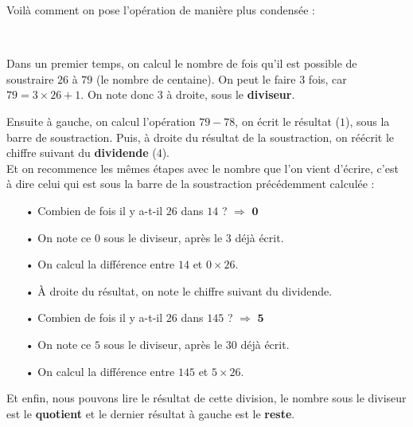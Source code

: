 \documentclass[a4paper]{article}
\begin{document}
\singlespacing

Voilà comment on pose l'opération de manière plus condensée : 

	\begin{center}

	 \\

	\end{center}

Dans un premier temps, on calcul le nombre de fois qu'il est possible de soustraire $26$ à $79$ (le nombre de centaine). On peut le faire $3$ fois, car $79 = 3 \times 26+1$. On note donc $3$ à droite, sous le \textbf{diviseur}. 

Ensuite à gauche, on calcul l'opération $79-78$, on écrit le résultat ($1$), sous la barre de soustraction. Puis, à droite du résultat de la soustraction, on réécrit le chiffre suivant du \textbf{dividende} ($4$).\\

Et on recommence les mêmes étapes avec le nombre que l'on vient d'écrire, c'est à dire celui qui est sous la barre de la soustraction précédemment calculée : 

\vspace{2 mm}

	\begin{itemize}
	
	\item[•] Combien de fois il y a-t-il $26$ dans $14$ ? $\Longrightarrow$ $\mathbf{0}$
	\item[•] On note ce $\mathit{0}$ sous le diviseur, après le $\mathit{3}$ déjà écrit.
	\item[•] On calcul la différence entre $14$ et $0\times26$.
	\item[•] À droite du résultat, on note le chiffre suivant du dividende.
	\vspace{2 mm}
	\item[•] Combien de fois il y a-t-il $26$ dans $145$ ? $\Longrightarrow$ $\mathbf{5}$
	\item[•] On note ce $\mathit{5}$ sous le diviseur, après le $\mathit{30}$ déjà écrit.
	\item[•] On calcul la différence entre $145$ et $5\times26$.
	
	\end{itemize}

\vspace{2 mm}

Et enfin, nous pouvons lire le résultat de cette division, le nombre sous le diviseur est le \textbf{quotient} et le dernier résultat à gauche est le \textbf{reste}.\\
\end{document}
